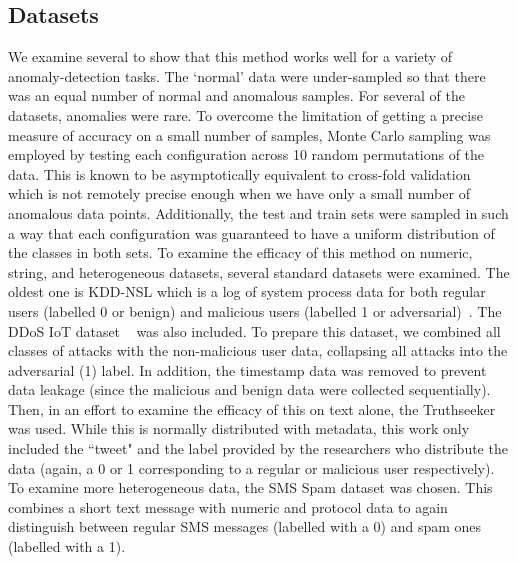 \documentclass[conference]{IEEEtran}
\begin{document}
\label{methods}
\subsection{Datasets}
\label{datasets}
We examine several to show that this method works well for a variety of anomaly-detection tasks. The `normal' data were under-sampled so that there was an equal number of normal and anomalous samples. For several of the datasets, anomalies were rare. 
To overcome the limitation of getting a precise measure of accuracy on a small number of samples, Monte Carlo sampling was employed by testing each configuration across 10 random permutations of the data. 
This is known to be asymptotically equivalent to cross-fold validation~\cite{shan2022monte} which is not remotely precise enough when we have only a small number of anomalous data points. 
Additionally, the test and train sets were sampled in such a way that each configuration was guaranteed to have a uniform distribution of the classes in both sets. To examine the efficacy of this method on numeric, string, and heterogeneous datasets, several standard datasets were examined. 
The oldest one is KDD-NSL which is a log of system process data for both regular users (labelled 0 or benign) and malicious users (labelled 1 or adversarial)~\cite{kddnsl}. The DDoS IoT dataset ~\cite{ddos} was also included. 
To prepare this dataset, we combined all classes of attacks with the non-malicious user data, collapsing all attacks into the adversarial (1) label. In addition, the timestamp data was removed to prevent data leakage  (since the malicious and benign data were collected sequentially). 
Then, in an effort to examine the efficacy of this on text alone, the Truthseeker ~\cite{truthseeker} was used. While this is normally distributed with metadata, this work only included the ``tweet" and the label provided by the researchers who distribute the data (again, a 0 or 1 corresponding to a regular or malicious user respectively). 
To examine more heterogeneous data, the SMS Spam dataset was chosen. 
This combines a short text message with numeric and protocol data to again distinguish between regular SMS messages (labelled with a 0) and spam ones (labelled with a 1). 
\end{document}

